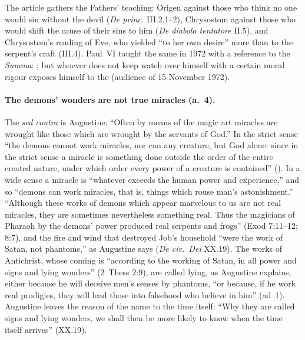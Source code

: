 The article gathers the Fathers' teaching: Origen against those who think
no one would sin without the devil (\emph{De princ.} III.2.1--2),
Chrysostom against those who would shift the cause of their sins to him
(\emph{De diabolo tentatore} II.5), and Chrysostom's reading of Eve,
who yielded ``to her own desire'' more than to the serpent's craft
(III.4). Paul~VI taught the same in 1972 with a reference to the
\emph{Summa}: ; but whoever does not keep watch over himself with a
certain moral rigour exposes himself to the 
(audience of 15 November 1972).

\paragraph{The demons' wonders are not true miracles (a.~4).} The
\emph{sed contra} is Augustine: ``Often by means of the magic art miracles
are wrought like those which are wrought by the servants of God.'' In the
strict sense ``the demons cannot work miracles, nor can any creature, but
God alone: since in the strict sense a miracle is something done outside
the order of the entire created nature, under which order every power of a
creature is contained'' (). In a wide sense a miracle is
``whatever exceeds the human power and experience,'' and so ``demons can
work miracles, that is, things which rouse man's astonishment.'' ``Although
these works of demons which appear marvelous to us are not real miracles,
they are sometimes nevertheless something real. Thus the magicians of
Pharaoh by the demons' power produced real serpents and frogs'' (Exod
7:11--12; 8:7), and the fire and wind that destroyed Job's household ``were
the work of Satan, not phantoms,'' as Augustine says (\emph{De civ.\ Dei}
XX.19). The works of Antichrist, whose coming is ``according to the working
of Satan, in all power and signs and lying wonders'' (2~Thess 2:9), are
called lying, as Augustine explains, either because he will deceive men's
senses by phantoms, ``or because, if he work real prodigies, they will lead
those into falsehood who believe in him'' (ad~1). Augustine leaves the
reason of the name to the time itself: ``Why they are called
signs and lying wonders, we shall then be more likely to know when the time
itself arrives'' (XX.19).

